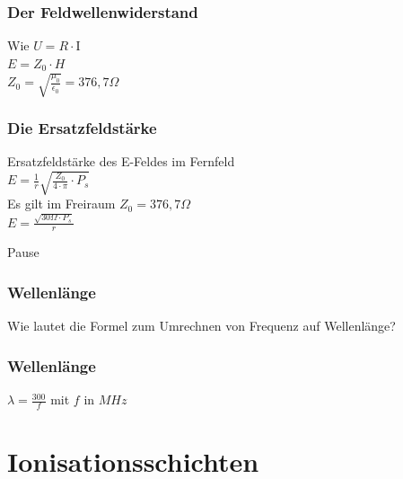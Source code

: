 \begin{frame}
    \frametitle{Der Feldwellenwiderstand}
    \begin{center}
        \huge Wie $U = R \cdot \mathrm{I}$  \\[1em]
    	\huge $E = Z_0 \cdot H$ \\[1em]
    	 $Z_0 = \sqrt{\frac{\mu_0}{\epsilon_0}} = 376,7 \Omega $\\[1em]
    \end{center}
\end{frame}

\begin{frame}
    \frametitle{Die Ersatzfeldstärke}
    \begin{center}
        \huge Ersatzfeldstärke des E-Feldes im Fernfeld \\[1em]
    	$E = \frac{1}{r} \sqrt{\frac{Z_0}{4 \cdot \pi} \cdot P_s}$ \\[1em]
    	Es gilt im Freiraum $Z_0 = 376,7 \Omega $\\[1em]
    	$E = \frac{\sqrt{30 \Omega \cdot P_s}}{r} $ \\[1em]
    \end{center}
\end{frame}

\begin{frame}
    \begin{center}
        \Huge Pause
    \end{center}
\end{frame}

\begin{frame}
    \frametitle{Wellenlänge}
    \begin{center}
        \huge Wie lautet die Formel zum Umrechnen von Frequenz auf Wellenlänge?
    \end{center}
\end{frame}

\begin{frame}
    \frametitle{Wellenlänge}
    \begin{center}
        \huge $\lambda = \frac{300}{f}$ mit $f$ in $MHz$
    \end{center}
\end{frame}

\section*{Ionisationsschichten}

